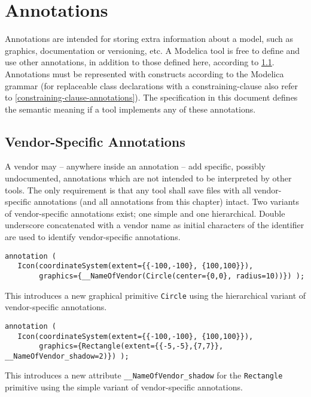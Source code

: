
\chapter{Annotations}\label{annotations}

Annotations are intended for storing extra information about a model,
such as graphics, documentation or versioning, etc. A Modelica tool is
free to define and use other annotations, in addition to those defined
here, according to \cref{vendor-specific-annotations}. Annotations must be
represented with constructs according to the Modelica grammar (for
replaceable class declarations with a constraining-clause also refer to
\cref{constraining-clause-annotations}). The specification in this document defines the
semantic meaning if a tool implements any of these annotations.

\section{Vendor-Specific Annotations}\label{vendor-specific-annotations}

A vendor may -- anywhere inside an annotation -- add specific, possibly
undocumented, annotations which are not intended to be interpreted by
other tools. The only requirement is that any tool
shall save files with all vendor-specific annotations (and all annotations from this chapter) intact.
Two variants of vendor-specific annotations exist; one
simple and one hierarchical. Double underscore concatenated with a
vendor name as initial characters of the identifier are used to identify
vendor-specific annotations.

\begin{example}
\begin{lstlisting}[language=modelica]
annotation (
   Icon(coordinateSystem(extent={{-100,-100}, {100,100}}),
        graphics={__NameOfVendor(Circle(center={0,0}, radius=10))}) );
\end{lstlisting}
This introduces a new graphical primitive \lstinline!Circle! using the
hierarchical variant of vendor-specific annotations.
\begin{lstlisting}[language=modelica]
annotation (
   Icon(coordinateSystem(extent={{-100,-100}, {100,100}}),
        graphics={Rectangle(extent={{-5,-5},{7,7}}, __NameOfVendor_shadow=2)}) );
\end{lstlisting}
This introduces a new attribute \lstinline!__NameOfVendor_shadow!
for the \lstinline!Rectangle! primitive using the simple variant of
vendor-specific annotations.
\end{example}

